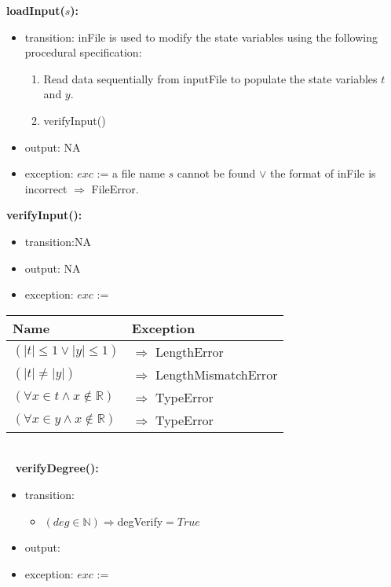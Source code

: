 \documentclass[12pt, titlepage]{article}
\begin{document}
\noindent \textbf{loadInput($s$):}
\begin{itemize}
	\item transition: {inFile} is used to modify the state variables using 
	the following procedural specification:
	
	\begin{enumerate}
		
		\item Read data sequentially from inputFile to populate the state 
		variables $t$ and $y$.
		
		\item verifyInput()
		
	\end{enumerate}
	\item output: NA
	\item exception: $exc$ := a file name $s$ cannot be found $\lor$ the format 
	of inFile is incorrect $\Rightarrow$ FileError.
	
\end{itemize}

\noindent \textbf{verifyInput():}
\begin{itemize}
\item transition:NA
\item output: NA
\item exception: $exc$ := 
\end{itemize}

\begin{tabular}{p{12cm} p{4.75cm}}
	
	\toprule
	\textbf{Name}&\textbf{Exception}\\
	\midrule


$ (|t| \leq 1 \lor |y| \leq 1)$ & $\Rightarrow$ LengthError\\
$ (|t| \neq |y|)$ & $\Rightarrow$ LengthMismatchError\\
$ (\forall x \in t \land  x \notin \mathbb{R} )$ & $\Rightarrow$ TypeError\\
$ (\forall x \in y \land  x \notin \mathbb{R} )$ & $\Rightarrow$ TypeError\\


\bottomrule
\end{tabular}\\

~\newline
\noindent \textbf{verifyDegree():}
\begin{itemize}
	\item transition: 
	\begin{itemize}
		
		\item $(deg \in \mathbb{N})\Longrightarrow $degVerify$ = 
		True$
	\end{itemize}
	\item output: 
	\item exception: $exc$ := 
\end{itemize}
\end{document}
